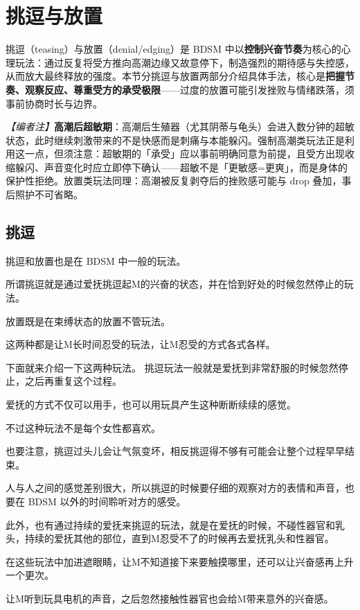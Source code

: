 \documentclass[12pt,UTF8]{ctexbook}
\begin{document}
\section{挑逗与放置}

挑逗（teasing）与放置（denial/edging）是 BDSM 中以\textbf{控制兴奋节奏}为核心的心理玩法：通过反复将受方推向高潮边缘又故意停下，制造强烈的期待感与失控感，从而放大最终释放的强度。本节分挑逗与放置两部分介绍具体手法，核心是\textbf{把握节奏、观察反应、尊重受方的承受极限}——过度的放置可能引发挫败与情绪跌落，须事前协商时长与边界。

\noindent\textit{【编者注】}\textbf{高潮后超敏期}：高潮后生殖器（尤其阴蒂与龟头）会进入数分钟的超敏状态，此时继续刺激带来的不是快感而是刺痛与本能躲闪。强制高潮类玩法正是利用这一点，但须注意：超敏期的「承受」应以事前明确同意为前提，且受方出现收缩躲闪、声音变化时应立即停下确认——超敏不是「更敏感=更爽」，而是身体的保护性拒绝。放置类玩法同理：高潮被反复剥夺后的挫败感可能与 drop 叠加，事后照护不可省略。

\subsection{挑逗}

挑逗和放置也是在 BDSM 中一般的玩法。

所谓挑逗就是通过爱抚挑逗起M的兴奋的状态，并在恰到好处的时候忽然停止的玩法。

放置既是在束缚状态的放置不管玩法。

这两种都是让M长时间忍受的玩法，让M忍受的方式各式各样。

下面就来介绍一下这两种玩法。 挑逗玩法一般就是爱抚到非常舒服的时候忽然停止，之后再重复这个过程。

爱抚的方式不仅可以用手，也可以用玩具产生这种断断续续的感觉。

不过这种玩法不是每个女性都喜欢。

也要注意，挑逗过头儿会让气氛变坏，相反挑逗得不够有可能会让整个过程早早结束。

人与人之间的感觉差别很大，所以挑逗的时候要仔细的观察对方的表情和声音，也要在 BDSM 以外的时间聆听对方的感受。

此外，也有通过持续的爱抚来挑逗的玩法，就是在爱抚的时候，不碰性器官和乳头，持续的爱抚其他的部位，直到M忍受不了的时候再去爱抚乳头和性器官。

在这些玩法中加进遮眼睛，让M不知道接下来要触摸哪里，还可以让兴奋感再上升一个更次。

让M听到玩具电机的声音，之后忽然接触性器官也会给M带来意外的兴奋感。
\end{document}
